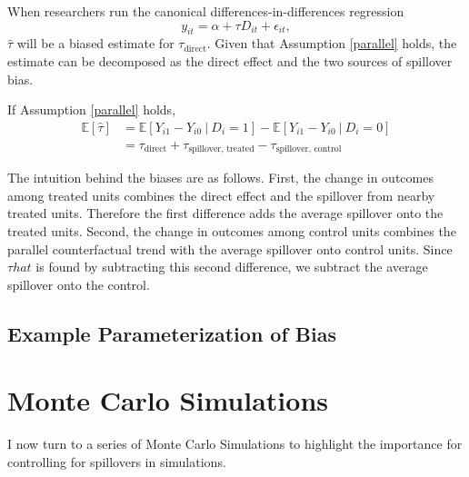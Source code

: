 \documentclass[11pt]{article}
\begin{document}
When researchers run the canonical differences-in-differences regression \[ 
    y_{it}  = \alpha + \tau D_{it} + \epsilon_{it},
\]
$\hat{\tau}$ will be a biased estimate for $\tau_{\text{direct}}$.
Given that Assumption \ref{parallel} holds, the estimate can be decomposed as the direct effect and the two sources of spillover bias.

\begin{theorem}
    \label{thm:bias}
    If Assumption \ref{parallel} holds, 
    \begin{align*}
        \mathbb{E}[\hat{\tau}] &= \mathbb{E}\left[ Y_{i1} - Y_{i0} \ \vert \ D_i = 1 \right] - \mathbb{E}\left[ Y_{i1} - Y_{i0} \ \vert \ D_i = 0 \right] \\ 
        &= \tau_{\text{direct}} + \tau_{\text{spillover, treated}} - \tau_{\text{spillover, control}}
    \end{align*}
\end{theorem}

The intuition behind the biases are as follows. First, the change in outcomes among treated units combines the direct effect and the spillover from nearby treated units. Therefore the first difference adds the average spillover onto the treated units. Second, the change in outcomes among control units combines the parallel counterfactual trend with the average spillover onto control units. Since $\tau{hat}$ is found by subtracting this second difference, we subtract the average spillover onto the control. 


\subsection{Example Parameterization of Bias}




\section{Monte Carlo Simulations}

I now turn to a series of Monte Carlo Simulations to highlight the importance for controlling for spillovers in simulations. 
\end{document}
